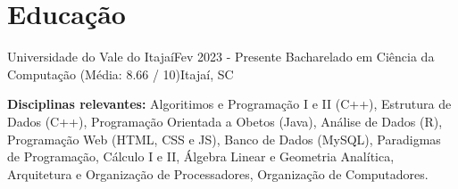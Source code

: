 \section{Educação}
    \resumeSubHeadingListStart

    \resumeSubheading
    {Universidade do Vale do Itajaí}{Fev 2023 - Presente}
    {Bacharelado em Ciência da Computação (Média: 8.66 / 10)}{Itajaí, SC}

    \hfill
        
    {\textbf{Disciplinas relevantes:}  Algoritimos e Programação I e II (C++), Estrutura de Dados (C++), Programação Orientada a Obetos (Java), Análise de Dados (R), Programação Web (HTML, CSS e JS), Banco de Dados (MySQL), Paradigmas de Programação, Cálculo I e II, Álgebra Linear e Geometria Analítica, Arquitetura e Organização de Processadores, Organização de Computadores.}


    \resumeSubHeadingListEnd